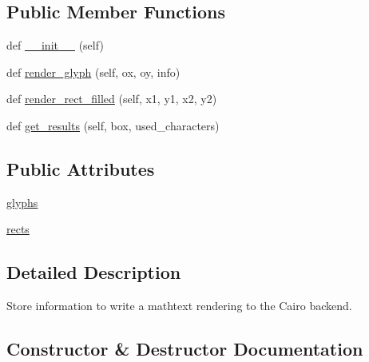 \subsection*{Public Member Functions}
\begin{DoxyCompactItemize}
\item 
def \hyperlink{classmatplotlib_1_1mathtext_1_1MathtextBackendCairo_af387b895a5c75c38a93dd90c8ccfb33c}{\+\_\+\+\_\+init\+\_\+\+\_\+} (self)
\item 
def \hyperlink{classmatplotlib_1_1mathtext_1_1MathtextBackendCairo_a321b8c2bae773867e6fd1d69f2790f5a}{render\+\_\+glyph} (self, ox, oy, info)
\item 
def \hyperlink{classmatplotlib_1_1mathtext_1_1MathtextBackendCairo_abcb659f84194b6f25416981c2a880bd1}{render\+\_\+rect\+\_\+filled} (self, x1, y1, x2, y2)
\item 
def \hyperlink{classmatplotlib_1_1mathtext_1_1MathtextBackendCairo_a285e05b99cbf22d7b79cdeb64f27edb2}{get\+\_\+results} (self, box, used\+\_\+characters)
\end{DoxyCompactItemize}
\subsection*{Public Attributes}
\begin{DoxyCompactItemize}
\item 
\hyperlink{classmatplotlib_1_1mathtext_1_1MathtextBackendCairo_a3d2fb7e09f8b80b1149690a530da4362}{glyphs}
\item 
\hyperlink{classmatplotlib_1_1mathtext_1_1MathtextBackendCairo_ab6625af009d83c51ff3df29779e01d06}{rects}
\end{DoxyCompactItemize}


\subsection{Detailed Description}
\begin{DoxyVerb}Store information to write a mathtext rendering to the Cairo
backend.
\end{DoxyVerb}
 

\subsection{Constructor \& Destructor Documentation}
\mbox{\label{classmatplotlib_1_1mathtext_1_1MathtextBackendCairo_af387b895a5c75c38a93dd90c8ccfb33c}} 
